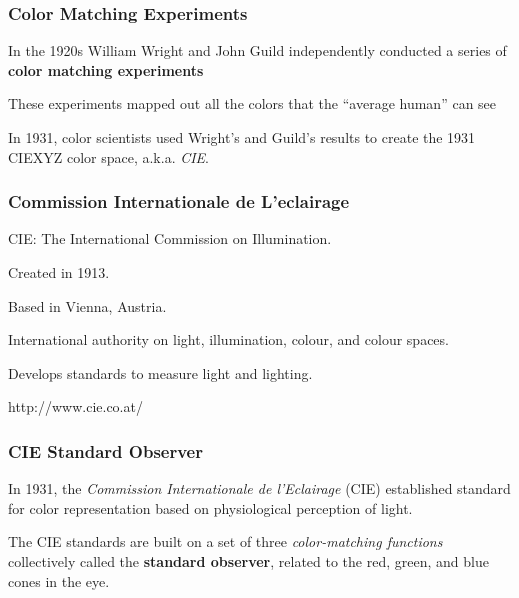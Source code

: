 \documentclass[12pt]{beamer}\usepackage[]{graphicx}\usepackage[]{color}
\begin{document}

\begin{frame}
\frametitle{Color Matching Experiments}

\bi
  \item In the 1920s William Wright and John Guild independently conducted a
  series of \textbf{color matching experiments}
  \item These experiments mapped out all the colors that the ``average human''
  can see
  \item In 1931, color scientists used Wright's and Guild's results to create
  the 1931 CIEXYZ color space, a.k.a. \textit{CIE}.
\ei

\end{frame}


\begin{frame}
\frametitle{Commission Internationale de L'eclairage}

\bi
  \item CIE: The International Commission on Illumination.
  \item Created in 1913.
  \item Based in Vienna, Austria.
  \item International authority on light, illumination, colour, and colour spaces.
  \item Develops standards to measure light and lighting.
  \item http://www.cie.co.at/
\ei

\end{frame}


\begin{frame}
\frametitle{CIE Standard Observer}

In 1931, the \textit{Commission Internationale de l'Eclairage} (CIE) 
established standard for color representation based on physiological 
perception of light.
\eb

The CIE standards are built on a set of three \textit{color-matching functions}
collectively called the \textbf{standard observer}, related to the red, green,
and blue cones in the eye.
\eb

\end{frame}

\end{document}
